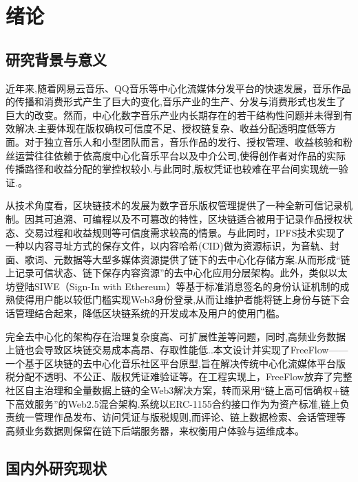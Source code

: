 \chapter{绪论}


\section{研究背景与意义}

近年来,随着网易云音乐、QQ音乐等中心化流媒体分发平台的快速发展，音乐作品的传播和消费形式产生了巨大的变化,音乐产业的生产、分发与消费形式也发生了巨大的改变。然而，中心化数字音乐产业内长期存在的若干结构性问题并未得到有效解决.主要体现在版权确权可信度不足、授权链复杂、收益分配透明度低等方面。对于独立音乐人和小型团队而言，音乐作品的发行、授权管理、收益核验和粉丝运营往往依赖于依高度中心化音乐平台以及中介公司,使得创作者对作品的实际传播路径和收益分配的掌控权较小.与此同时,版权凭证也较难在平台间实现统一验证.\cite{Torbensen2019,Arenal2024,Centorrino2023}。

从技术角度看，区块链技术的发展为数字音乐版权管理提供了一种全新可信记录机制。因其可追溯、可编程以及不可篡改的特性，区块链适合被用于记录作品授权状态、交易过程和收益规则等可信度需求较高的情景。与此同时，IPFS技术实现了一种以内容寻址方式的保存文件，以内容哈希(CID)做为资源标识，为音轨、封面、歌词、元数据等大型多媒体资源提供了链下的去中心化存储方案.从而形成“链上记录可信状态、链下保存内容资源”的去中心化应用分层架构。此外，类似以太坊登陆SIWE（Sign-In with Ethereum）等基于标准消息签名的身份认证机制的成熟使得用户能以较低门槛实现Web3身份登录,从而让维护者能将链上身份与链下会话管理结合起来，降低区块链系统的开发成本及用户的使用门槛\cite{ipfsDocs,eip4361}。

完全去中心化的架构存在治理复杂度高、可扩展性差等问题\cite{Torbensen2019,Arenal2024,Chen2021,Rikken2019,Alawadi2024}，同时,高频业务数据上链也会导致区块链交易成本高昂、存取性能低.\cite{Wei2022BDMSSurvey,Liu2020GasExceptions}.本文设计并实现了FreeFlow——一个基于区块链的去中心化音乐社区平台原型,旨在解决传统中心化流媒体平台版税分配不透明、不公正、版权凭证难验证等。在工程实现上，FreeFlow放弃了完整社区自主治理和全量数据上链的全Web3解决方案，转而采用“链上高可信确权+链下高效服务”的Web2.5混合架构.系统以ERC-1155合约接口作为为资产标准\cite{eip721,eip1155,eip2981},链上负责统一管理作品发布、访问凭证与版税规则,而评论、链上数据检索、会话管理等高频业务数据则保留在链下后端服务器，来权衡用户体验与运维成本。


\section{国内外研究现状}


